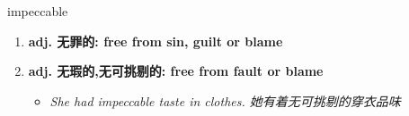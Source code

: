 
\begin{frame}
{\huge impeccable}
\begin{center}
\begin{enumerate}\Large
  \item \textbf{adj. 无罪的: free from sin, guilt or blame}
  \item \textbf{adj. 无瑕的,无可挑剔的: free from fault or blame}
  \begin{itemize}
    \item \em{\Large{She had impeccable taste in clothes. 她有着无可挑剔的穿衣品味}}
  \end{itemize}
\end{enumerate}
\end{center}
\end{frame}

